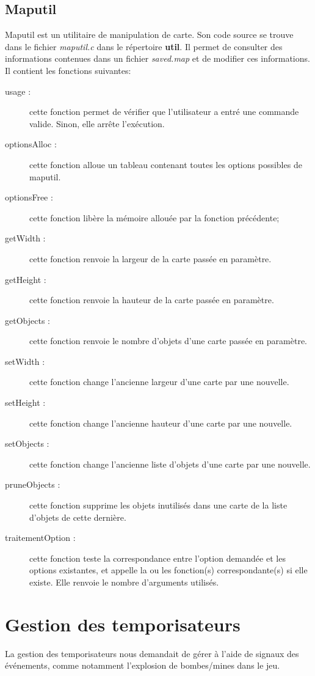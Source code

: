 \documentclass{report}
\begin{document}
\section{Maputil}
Maputil est un utilitaire de manipulation de carte. Son code source se trouve dans le fichier \textit{maputil.c} dans le répertoire \textbf{util}. Il permet de consulter des informations contenues dans un fichier \textit{saved.map} et de modifier ces informations. Il contient les fonctions suivantes:
\begin{description}
  \item[usage :] cette fonction permet de vérifier que l'utilisateur a entré une commande valide. Sinon, elle arrête l'exécution.
  \item[optionsAlloc :] cette fonction alloue un tableau contenant toutes les options possibles de maputil.
  \item[optionsFree :] cette fonction libère la mémoire allouée par la fonction précédente;
  \item[getWidth :] cette fonction renvoie la largeur de la carte passée en paramètre.
  \item[getHeight :] cette fonction renvoie la hauteur de la carte passée en paramètre.
  \item[getObjects :] cette fonction renvoie le nombre d'objets d'une carte passée en paramètre.
  \item[setWidth :] cette fonction change l'ancienne largeur d'une carte par une nouvelle.
  \item[setHeight :] cette fonction change l'ancienne hauteur d'une carte par une nouvelle.
  \item[setObjects :] cette fonction change l'ancienne liste d'objets d'une carte par une nouvelle.
  \item[pruneObjects :] cette fonction supprime les objets inutilisés dans une carte de la liste d'objets de cette dernière.
  \item[traitementOption :] cette fonction teste la correspondance entre l'option demandée et les options existantes, et appelle la ou les fonction(s) correspondante(s) si elle existe. Elle renvoie le nombre d'arguments utilisés.
\end{description}


\chapter{Gestion des temporisateurs}
\setcounter{section}{0}
La gestion des temporisateurs nous demandait de gérer à l'aide de signaux des événements, comme notamment l'explosion de bombes/mines dans le jeu.
\end{document}
